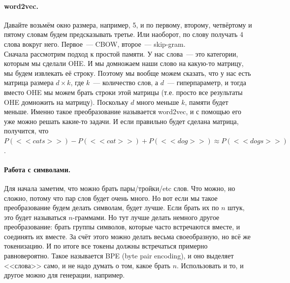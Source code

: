 \documentclass{article}
\begin{document}
    \paragraph{word2vec.}
    Давайте возьмём окно размера, например, 5, и по первому, второму, четвёртому и пятому словам будем предсказывать третье. Или наоборот, по слову получать 4 слова вокруг него. Первое~--- CBOW, второе~--- skip-gram.\\
    Сначала рассмотрим подход к простой памяти. У нас слова~--- это категории, которым мы сделали OHE. И мы домножаем наши слово на какую-то матрицу, мы будем извлекать её строку. Поэтому мы вообще можем сказать, что у нас есть матрица размера $d\times k$, где $k$~--- количество слов, а $d$~--- гиперпараметр, и тогда вместо OHE мы можем брать строки этой матрицы (т.е. просто все результаты OHE домножить на матрицу). Поскольку $d$ много меньше $k$, памяти будет меньше. Именно такое преобразование называется word2vec, и с помощью его уже можно решать какие-то задачи. И если правильно будет сделана матрица, получится, что $P(<<cats>>)-P(<<cat>>)+P(<<dog>>)\approx P(<<dogs>>)$.
    \paragraph{Работа с символами.}
    Для начала заметим, что можно брать пары/тройки/etc слов. Что можно, но сложно, потому что пар слов будет очень много. Но вот если мы такое преобразование будем делать символам, будет лучше. Если брать их по $n$ штук, это будет называться $n$-граммами. Но тут лучше делать немного другое преобразование: брать группы символов, которые часто встречаются вместе, и соединять их вместе. За счёт этого можно делать весьма своеобразную, но всё же токенизацию. И по итоге все токены должны встречаться примерно равновероятно. Такое называется BPE (byte pair encoding), и оно выделяет <<слова>> само, и не надо думать о том, какое брать $n$. Использовать и то, и другое можно для генерации, например.
    
\end{document}
